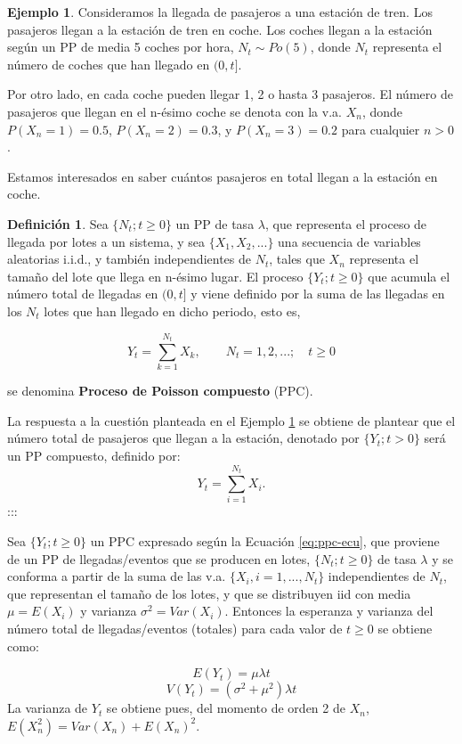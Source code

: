 \documentclass[
]{book}
\newenvironment{yellowbox}{
  \definecolor{shadecolor}{rgb}{210, 180, 140}  
  \color{black}
  \begin{shaded}}
 {\end{shaded}}
\newenvironment{bluebox}{
  \definecolor{shadecolor}{rgb}{176, 196, 222}  
  \color{black}
  \begin{shaded}}
 {\end{shaded}}
\theoremstyle{definition}
\newtheorem{definition}{Definición}[chapter]
\theoremstyle{definition}
\newtheorem{example}{Ejemplo}[chapter]
\theoremstyle{definition}
\theoremstyle{definition}
\theoremstyle{remark}
\begin{document}
\begin{example}
\protect\hypertarget{exm:pp004}{}\label{exm:pp004}Consideramos la llegada de pasajeros a una estación de tren. Los pasajeros llegan a la estación de tren en coche. Los coches llegan a la estación según un PP de media 5 coches por hora, \(N_t \sim Po(5)\), donde \(N_t\) representa el número de coches que han llegado en \((0,t]\).

Por otro lado, en cada coche pueden llegar 1, 2 o hasta 3 pasajeros. El número de pasajeros que llegan en el n-ésimo coche se denota con la v.a. \(X_n\), donde \(P(X_n = 1) = 0.5\), \(P(X_n = 2) = 0.3\), y \(P(X_n = 3) = 0.2\) para cualquier \(n>0\).

Estamos interesados en saber cuántos pasajeros en total llegan a la estación en coche.
\end{example}

\begin{yellowbox}

\begin{definition}
\protect\hypertarget{def:ppcompuesto}{}\label{def:ppcompuesto}Sea \(\{N_t; t \geq 0\}\) un PP de tasa \(\lambda\), que representa el proceso de llegada por lotes a un sistema, y sea \(\{X_1, X_2,...\}\) una secuencia de variables aleatorias i.i.d., y también independientes de \(N_t\), tales que \(X_n\) representa el tamaño del lote que llega en n-ésimo lugar. El proceso \(\{Y_t; t \geq 0\}\) que acumula el número total de llegadas en \((0,t]\) y viene definido por la suma de las llegadas en los \(N_t\) lotes que han llegado en dicho periodo, esto es,

\begin{equation} 
Y_t = \sum_{k=1}^{N_t} X_k, \qquad N_t=1,2,...; \quad t\geq 0
\label{eq:ppc-ecu}
\end{equation}

se denomina \textbf{Proceso de Poisson compuesto} (PPC).
\end{definition}

\end{yellowbox}

La respuesta a la cuestión planteada en el Ejemplo \ref{exm:pp004} se obtiene de plantear que el número total de pasajeros que llegan a la estación, denotado por \(\{Y_t; t > 0 \}\) será un PP compuesto, definido por: \[Y_t=\sum_{i=1}^{N_t} X_i.\] :::

\begin{bluebox}
Sea \(\{Y_t; t \geq 0\}\) un PPC expresado según la Ecuación \eqref{eq:ppc-ecu}, que proviene de un PP de llegadas/eventos que se producen en lotes, \(\{N_t; t \geq 0\}\) de tasa \(\lambda\) y se conforma a partir de la suma de las v.a. \(\{X_i, i=1,...,N_t\}\) independientes de \(N_t\), que representan el tamaño de los lotes, y que se distribuyen iid con media \(\mu=E(X_i)\) y varianza \(\sigma^2=Var(X_i)\). Entonces la esperanza y varianza del número total de llegadas/eventos (totales) para cada valor de \(t \geq 0\) se obtiene como:

\[E(Y_t) = \mu \lambda t\] \[V(Y_t) = (\sigma^2+\mu^2) \lambda t\] La varianza de \(Y_t\) se obtiene pues, del momento de orden 2 de \(X_n\), \(E(X_n^2)=Var(X_n)+E(X_n)^2\).

\end{bluebox}
\end{document}
